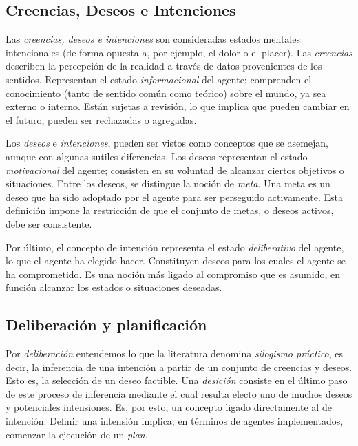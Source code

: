\subsection{Creencias, Deseos e Intenciones}

Las \textit{creencias, deseos e intenciones} son consideradas estados mentales 
intencionales (de forma opuesta a, por ejemplo, el dolor o el placer). Las \textit{creencias} 
describen la percepción de la realidad a través de datos provenientes de 
los sentidos. Representan el estado \textit{informacional} del agente; comprenden
el conocimiento (tanto de sentido común como teórico) sobre el mundo, ya sea 
externo o interno. Están sujetas a revisión, lo que implica que pueden 
cambiar en el futuro, pueden ser rechazadas o agregadas. 

Los \textit{deseos} e \textit{intenciones}, pueden ser vistos como conceptos que 
se asemejan, aunque con algunas sutiles diferencias. Los deseos representan el 
estado \textit{motivacional} del agente; consisten en su voluntad de alcanzar 
ciertos objetivos o situaciones. Entre los deseos, se distingue la noción de 
\textit{meta}. Una meta es un deseo que ha sido adoptado por el agente para 
ser perseguido activamente. Esta definición impone la restricción de que el 
conjunto de metas, o deseos activos, debe ser consistente. 

Por último, el concepto de intención representa el estado \textit{deliberativo}
del agente, lo que el agente ha elegido hacer. Constituyen deseos para los cuales
el agente se ha comprometido. Es una noción más ligado al compromiso que es 
asumido, en función alcanzar los estados o situaciones deseadas. 

\subsection{Deliberación y planificación}

Por \textit{deliberación} entendemos lo que la literatura denomina \textit{silogismo práctico},
es decir, la inferencia de una intención a partir de un conjunto de creencias y
deseos. Esto es, la selección de un deseo factible. Una \textit{desición} 
consiste en el último paso de este proceso de inferencia mediante el cual 
resulta electo uno de muchos deseos y potenciales intensiones. Es, por esto, un
concepto ligado directamente al de intención. Definir una intensión implica, en 
términos de agentes implementados, comenzar la ejecución de un \textit{plan}.

